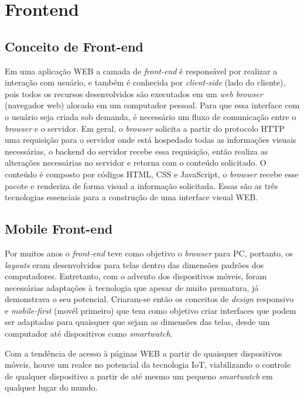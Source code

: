\documentclass[../../layout.tex]{subfiles}
\begin{document}
\section{Frontend}
\subsection{Conceito de Front-end}
\hspace*{3em}Em uma aplicação WEB a camada de \emph{front-end} é responsável por realizar a interação com usuário, e  também é conhecida por \emph{client-side} (lado do cliente), pois todos os recursos desenvolvidos são executados em um \emph{web browser} (navegador web) alocado em um computador pessoal. Para que essa interface com o usuário seja criada sob demanda, é necessário um fluxo de comunicação entre o \emph{browser} e o servidor. Em geral, o \emph{browser} solicita a partir do protocolo HTTP uma requisição para o servidor onde está hospedado todas as informações visuais necessárias, o backend do servidor recebe essa requisição, então realiza as alterações necessárias no servidor e retorna com o conteúdo solicitado. O conteúdo é composto por códigos HTML, CSS e JavaScript, o \emph{browser} recebe esse pacote e renderiza de forma visual a informação solicitada. Essas são as três tecnologias essenciais para a construção de uma interface visual WEB.\cite{frontend}

\subsection{Mobile Front-end}
\hspace*{3em}Por  muitos anos o \emph{front-end} teve como objetivo o \emph{browser} para PC, portanto, os \emph{layouts} eram desenvolvidos para telas dentro das dimensões padrões dos computadores. Entretanto, com o advento dos dispositivos móveis, foram necessárias adaptações à tecnologia que apesar de muito prematura, já demonstrava o seu potencial. Criaram-se então os conceitos de \emph{design} responsivo e \emph{mobile-first} (movél primeiro) que tem como objetivo criar interfaces que podem ser adaptadas para quaisquer que sejam as dimensões das telas, desde um computador até dispositivos como \emph{smartwatch}.\par
Com a tendência de acesso à páginas WEB a partir de quaisquer dispositivos móveis, houve um realce no potencial da tecnologia IoT, viabilizando o controle de qualquer dispositivo a partir de até mesmo um pequeno \emph{smartwatch} em qualquer lugar do mundo.\cite{mobilefrontend}
\end{document}
